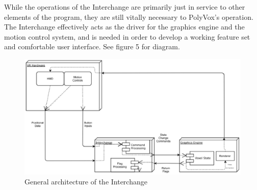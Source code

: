\documentclass[onecolumn, draftclsnofoot,10pt, compsoc]{IEEEtran}
\begin{document}
While the operations of the Interchange are primarily just in service to other elements of the program, they are still vitally necessary to PolyVox’s operation. The Interchange effectively acts as the driver for the graphics engine and the motion control system, and is needed in order to develop a working feature set and comfortable user interface. See figure 5 for diagram.

\begin{figure}[H]
\begin{center}
\includegraphics[width=\textwidth]{Interchange.eps}
\caption{General architecture of the Interchange}
\end{center}
\end{figure}
\end{document}
